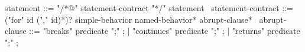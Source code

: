 \begin{syntax}
  statement ::= "/*@" statement-contract "*/" statement
  \
  statement-contract ::= {("for" id ("," id)*)?}
    simple-behavior named-behavior*
    {abrupt-clause*}
  \
  abrupt-clause ::= {"breaks" predicate ";"} ;
  | {"continues" predicate ";"} ;
  | {"returns" predicate ";"} ;
\end{syntax}
